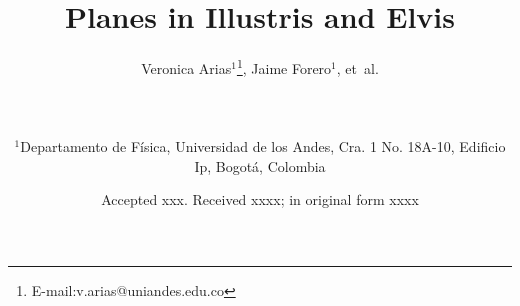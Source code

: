 \documentclass[useAMS,usenatbib]{mn2e}
\begin{document}

\title[Planes in Illustris and Elvis]{Planes in Illustris and Elvis}
\author[Arias et al.]{
{\parbox{\textwidth}{
Veronica Arias$^{1}$\thanks{E-mail:v.arias@uniandes.edu.co}, 
Jaime Forero$^1$,
et~al.\\}}
\vspace{0.1cm}\\
\parbox{\textwidth}{
$^1$Departamento de F\'isica, Universidad de los Andes, Cra. 1 No. 18A-10, Edificio Ip, Bogot\'a, Colombia\\
}}

\date{Accepted xxx. Received xxxx; in original form xxxx}
\end{document}
